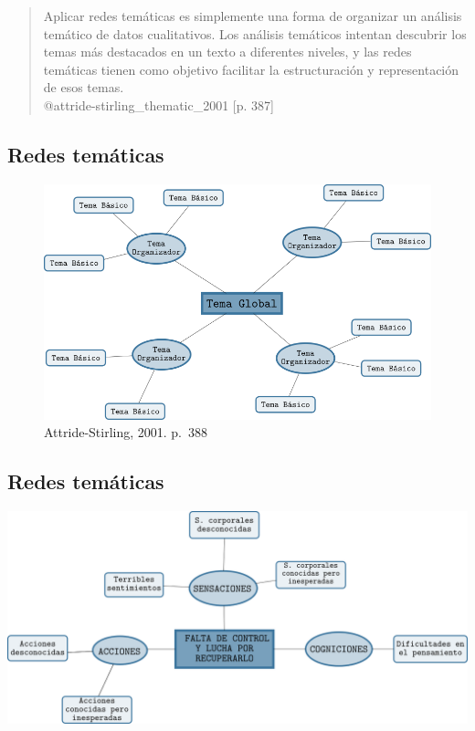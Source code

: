 \begin{quote}
Aplicar redes temáticas es simplemente una forma de organizar un
análisis temático de datos cualitativos. Los análisis temáticos intentan
descubrir los temas más destacados en un texto a diferentes niveles, y
las redes temáticas tienen como objetivo {facilitar la estructuración y
representación} de esos temas.\\
@attride-stirling\_thematic\_2001 {[}p. 387{]}
\end{quote}

\hypertarget{redes-tematicas}{%
\subsection{Redes temáticas}\label{redes-tematicas}}

\begin{figure}
\centering
\includegraphics{imagenes-cuali/RedesTematicas.png}
\caption{Attride-Stirling, 2001. p.~388}
\end{figure}

\hypertarget{redes-tematicas-2}{%
\subsection{Redes temáticas}\label{redes-tematicas-2}}

\includegraphics{imagenes-cuali/RedesTematicas-2.png}

